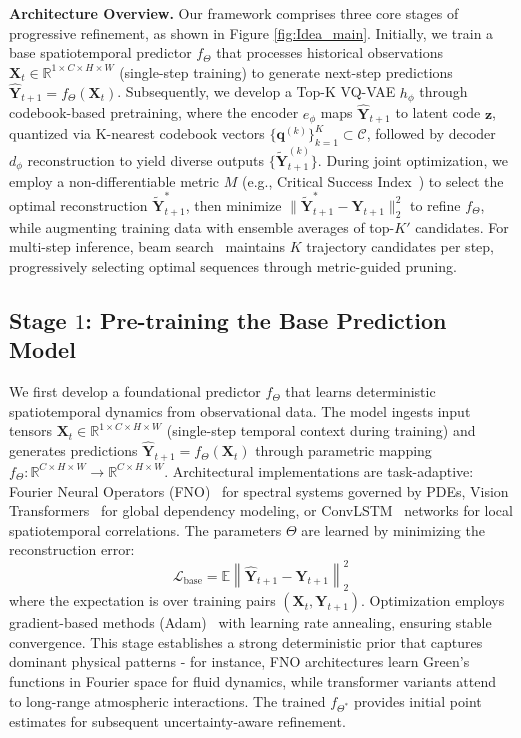 \textbf{Architecture Overview.} Our framework comprises three core stages of progressive refinement, as shown in Figure \ref{fig:Idea_main}. Initially, we train a base spatiotemporal predictor $f_\Theta$ that processes historical observations $\mathbf{X}_t \in \mathbb{R}^{1 \times C \times H \times W}$ (single-step training) to generate next-step predictions $\hat{\mathbf{Y}}_{t+1} = f_\Theta(\mathbf{X}_t)$. Subsequently, we develop a Top-K VQ-VAE $h_{\phi}$ through codebook-based pretraining, where the encoder $e_\phi$ maps $\hat{\mathbf{Y}}_{t+1}$ to latent code $\mathbf{z}$, quantized via K-nearest codebook vectors $\{\mathbf{q}^{(k)}\}_{k=1}^K \subset \mathcal{C}$, followed by decoder $d_\phi$ reconstruction to yield diverse outputs $\{\tilde{\mathbf{Y}}_{t+1}^{(k)}\}$. During joint optimization, we employ a non-differentiable metric $M$ (e.g., Critical Success Index~\cite{gao2022earthformer}) to select the optimal reconstruction $\tilde{\mathbf{Y}}_{t+1}^*$, then minimize $\|\tilde{\mathbf{Y}}_{t+1}^* - \mathbf{Y}_{t+1}\|_2^2$ to refine $f_\Theta$, while augmenting training data with ensemble averages of top-$K'$ candidates. For multi-step inference, beam search~\cite{steinbiss1994improvements} maintains $K$ trajectory candidates per step, progressively selecting optimal sequences through metric-guided pruning.

\subsection{Stage $1$: Pre-training the Base Prediction Model}
We first develop a foundational predictor $f_{\Theta}$ that learns deterministic spatiotemporal dynamics from observational data. The model ingests input tensors $\mathbf{X}_t \in \mathbb{R}^{1 \times C \times H \times W}$ (single-step temporal context during training) and generates predictions $\hat{\mathbf{Y}}_{t+1} = f_{\Theta}(\mathbf{X}_t)$ through parametric mapping $f_{\Theta}: \mathbb{R}^{C \times H \times W} \to \mathbb{R}^{C \times H \times W}$. Architectural implementations are task-adaptive: Fourier Neural Operators (FNO)~\cite{li2020fourier} for spectral systems governed by PDEs, Vision Transformers~\cite{dosovitskiy2020image} for global dependency modeling, or ConvLSTM~\cite{shi2015convolutional} networks for local spatiotemporal correlations. The parameters $\Theta$ are learned by minimizing the reconstruction error:
\begin{equation}
\mathcal{L}_{\text{base}} = \mathbb{E} \left\| \hat{\mathbf{Y}}_{t+1} - \mathbf{Y}_{t+1} \right\|_2^2
\end{equation}
where the expectation is over training pairs $(\mathbf{X}_t, \mathbf{Y}_{t+1})$. Optimization employs gradient-based methods (Adam)~\cite{kingma2014adam} with learning rate annealing, ensuring stable convergence. This stage establishes a strong deterministic prior that captures dominant physical patterns - for instance, FNO architectures learn Green's functions in Fourier space for fluid dynamics, while transformer variants attend to long-range atmospheric interactions. The trained $f_{\Theta^*}$ provides initial point estimates for subsequent uncertainty-aware refinement.

